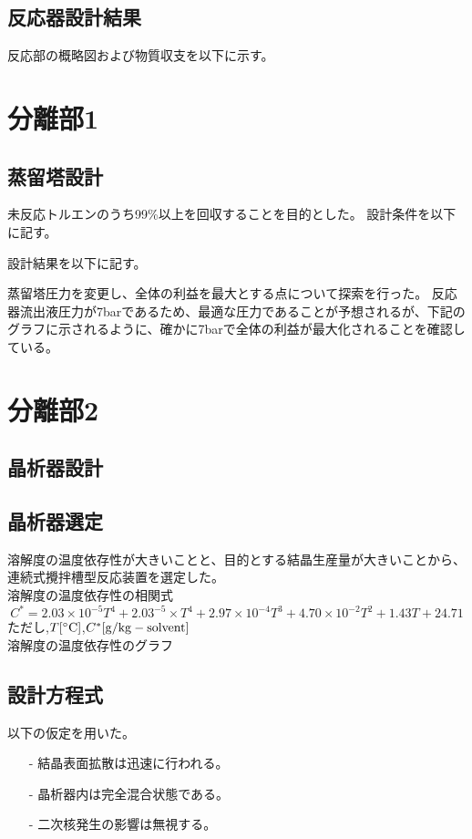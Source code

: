 \documentclass[a4j]{jsreport}
\begin{document}
\section{反応器設計結果} 
反応部の概略図および物質収支を以下に示す。

\newpage
\chapter{分離部1}
\section{蒸留塔設計}
未反応トルエンのうち99\%以上を回収することを目的とした。
設計条件を以下に記す。

設計結果を以下に記す。

蒸留塔圧力を変更し、全体の利益を最大とする点について探索を行った。
反応器流出液圧力が7barであるため、最適な圧力であることが予想されるが、下記の
グラフに示されるように、確かに7barで全体の利益が最大化されることを確認している。

\newpage
\chapter{分離部2}
\section{晶析器設計}
\section{晶析器選定}
溶解度の温度依存性が大きいことと、目的とする結晶生産量が大きいことから、
連続式攪拌槽型反応装置を選定した。\\
溶解度の温度依存性の相関式
\begin{equation}
    C^*=2.03\times 10^{-5}T^4 +2.03^{-5}\times T^4 + 2.97\times 10^{-4}T^3 + 4.70\times 10^{-2}T^2
        + 1.43T + 24.71
\end{equation}
ただし,$T[{\rm ^\circ C}]$,$C^*[{\rm g/kg-solvent}]$\\
溶解度の温度依存性のグラフ


\section{設計方程式}
以下の仮定を用いた。
\begin{itemize}
    \setlength{\parskip}{0pt}
    \setlength{\itemsep}{2pt} 
    \item[-] 結晶表面拡散は迅速に行われる。
    \item[-] 晶析器内は完全混合状態である。
    \item[-] 二次核発生の影響は無視する。
\end{itemize}
\end{document}
